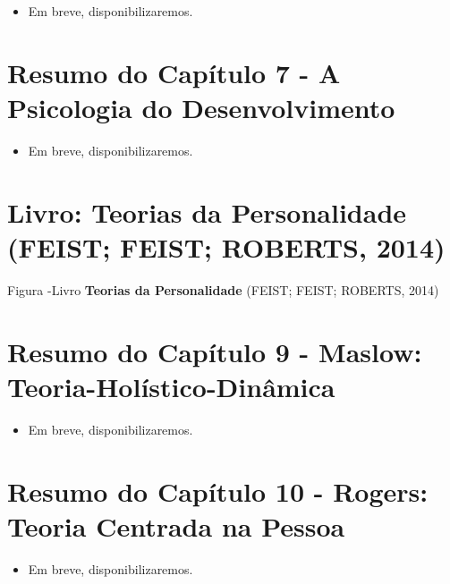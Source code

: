 \documentclass[
]{book}
\providecommand{\tightlist}{%
  \setlength{\itemsep}{0pt}\setlength{\parskip}{0pt}}
\begin{document}
\begin{itemize}
\tightlist
\item
  Em breve, disponibilizaremos.
\end{itemize}

\hypertarget{resumo-do-capuxedtulo-7---a-psicologia-do-desenvolvimento}{%
\section{Resumo do Capítulo 7 - A Psicologia do Desenvolvimento}\label{resumo-do-capuxedtulo-7---a-psicologia-do-desenvolvimento}}

\begin{itemize}
\tightlist
\item
  Em breve, disponibilizaremos.
\end{itemize}

\hypertarget{livro-teorias-da-personalidade-feist-feist-roberts-2014}{%
\section{\texorpdfstring{Livro: \textbf{Teorias da Personalidade} (FEIST; FEIST; ROBERTS, 2014)}{Livro: Teorias da Personalidade (FEIST; FEIST; ROBERTS, 2014)}}\label{livro-teorias-da-personalidade-feist-feist-roberts-2014}}

Figura -Livro \textbf{Teorias da Personalidade} (FEIST; FEIST; ROBERTS, 2014)

\hypertarget{resumo-do-capuxedtulo-9---maslow-teoria-holuxedstico-dinuxe2mica}{%
\section{Resumo do Capítulo 9 - Maslow: Teoria-Holístico-Dinâmica}\label{resumo-do-capuxedtulo-9---maslow-teoria-holuxedstico-dinuxe2mica}}

\begin{itemize}
\tightlist
\item
  Em breve, disponibilizaremos.
\end{itemize}

\hypertarget{resumo-do-capuxedtulo-10---rogers-teoria-centrada-na-pessoa}{%
\section{Resumo do Capítulo 10 - Rogers: Teoria Centrada na Pessoa}\label{resumo-do-capuxedtulo-10---rogers-teoria-centrada-na-pessoa}}

\begin{itemize}
\tightlist
\item
  Em breve, disponibilizaremos.
\end{itemize}
\end{document}

